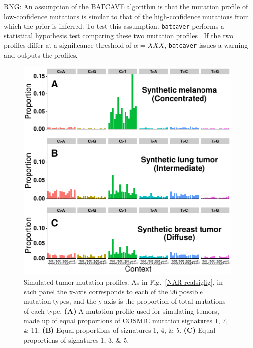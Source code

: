 \documentclass[a4,center,fleqn]{NAR}
\newcommand{\rngcomment}[1]{{\color{red}RNG: #1}}
\newcommand{\batcave}{BATCAVE\xspace}
\begin{document}
\rngcomment{
An assumption of the \batcave algorithm is that the mutation profile of low-confidence mutations is similar to that of the high-confidence mutations from which the prior is inferred.
To test this assumption, \texttt{batcaver} performs a statistical hypothesis test comparing these two mutation profiles \cite{Plunkett2019}.
If the two profiles differ at a significance threshold of $\alpha=XXX$, \texttt{batcaver} issues a warning and outputs the profiles.
}

\begin{figure}
\centering
  \includegraphics{figures/sim_signatures_only.pdf}
  \caption{Simulated tumor mutation profiles.
As in Fig.~\ref{NAR-realsigfig}, in each panel the x-axis corresponds to each of the 96 possible mutation types, and the y-axis is the proportion of total mutations of each type.
  \textbf{(A)} A mutation profile used for simulating tumors, made up of equal proportions of COSMIC mutation signatures 1, 7, \& 11.
  \textbf{(B)} Equal proportions of signatures 1, 4, \& 5.
  \textbf{(C)} Equal proportions of signatures 1, 3, \& 5.
   }
  \label{NAR-simsigfig}
 \end{figure}
\end{document}
